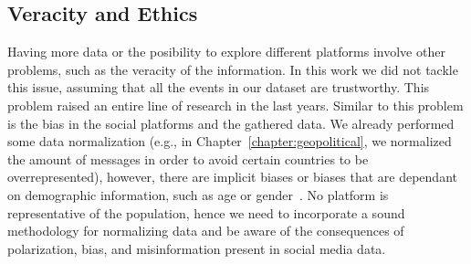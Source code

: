 \subsection*{Veracity and Ethics}
%
Having more data or the posibility to explore different platforms involve other
problems, such as the veracity of the information.
%
In this work we did not tackle this issue, assuming that all the events in our
dataset are trustworthy.
%
This problem raised an entire line of research in the last years.
%
Similar to this problem is the bias in the social platforms and the gathered
data.
%
We already performed some data normalization (e.g., in
Chapter~\ref{chapter:geopolitical}, we normalized the amount of messages in
order to avoid certain countries to be overrepresented), however, there are
implicit biases or biases that are dependant on demographic information, such as
age or gender~\cite{Graells-Garrido:2019:RAD:3292522.3326057}.
%
No platform is representative of the population, hence we need to incorporate a
sound methodology for normalizing data and be aware of the consequences of
polarization, bias, and misinformation present in social media data.